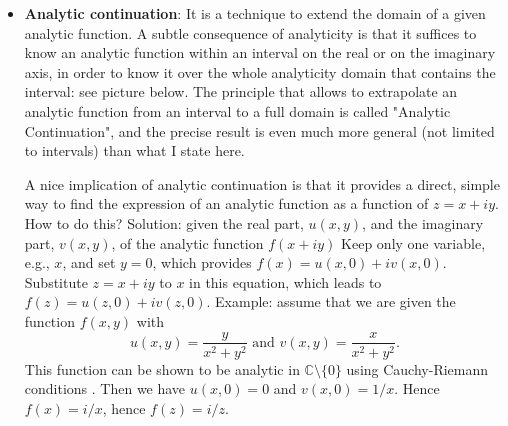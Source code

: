 \begin{itemize}
\item \textbf{Analytic continuation}: It is a technique to extend the domain of a given analytic function. A subtle consequence of analyticity is that it suffices to know an analytic function within an interval on the real or on the imaginary axis, in order to know it over the whole analyticity domain that contains the interval: see picture below. The principle that allows to extrapolate an analytic function from an interval to a full domain is called "Analytic Continuation", and the precise result is even much more general (not limited to intervals) than what I state here.

A nice implication of analytic continuation is that it provides a direct, simple way to find the expression of an analytic function as a function of $z=x+iy$. How to do this? Solution: given the real part, $u(x,y)$, and the imaginary part, $v(x,y)$, of the analytic function $f(x+iy)$
Keep only one variable, e.g., $x$, and set $y=0$, which provides $f(x)=u(x,0)+iv(x,0)$.
Substitute $z=x+iy$ to $x$ in this equation, which leads to $f(z)=u(z,0)+iv(z,0)$.
Example: assume that we are given the function $f(x,y)$ with
$$\displaystyle u(x,y)=\frac{y}{x^2+y^2}\mbox{ and }v(x,y)=\frac{x}{x^2+y^2}.$$
This function can be shown to be analytic in ${\mathbb C}\setminus\{0\}$ using Cauchy-Riemann conditions . Then we have $u(x,0)=0$ and $v(x,0)=1/x$. Hence $f(x)=i/x$, hence $f(z)=i/z$.
\end{itemize}